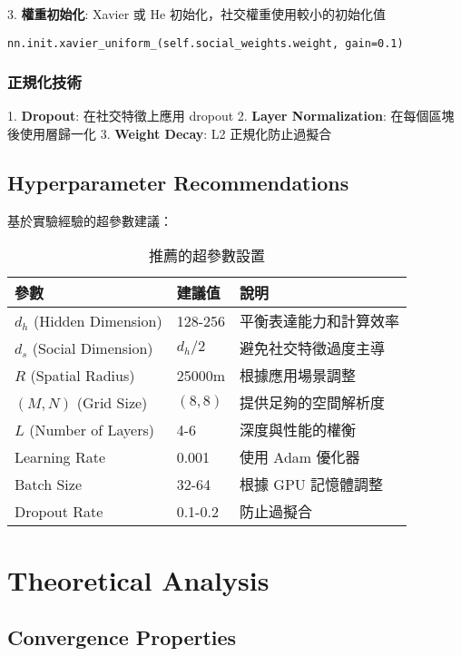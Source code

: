 \documentclass[11pt,a4paper]{article}
\begin{document}
3. \textbf{權重初始化}: Xavier 或 He 初始化，社交權重使用較小的初始化值
   \begin{lstlisting}[style=pythonstyle]
   nn.init.xavier_uniform_(self.social_weights.weight, gain=0.1)
   \end{lstlisting}

\subsubsection{正規化技術}
1. \textbf{Dropout}: 在社交特徵上應用 dropout
2. \textbf{Layer Normalization}: 在每個區塊後使用層歸一化
3. \textbf{Weight Decay}: L2 正規化防止過擬合

\subsection{Hyperparameter Recommendations}

基於實驗經驗的超參數建議：

\begin{table}[h]
\centering
\begin{tabular}{|l|l|l|}
\hline
\textbf{參數} & \textbf{建議值} & \textbf{說明} \\
\hline
$d_h$ (Hidden Dimension) & 128-256 & 平衡表達能力和計算效率 \\
$d_s$ (Social Dimension) & $d_h / 2$ & 避免社交特徵過度主導 \\
$R$ (Spatial Radius) & 25000m & 根據應用場景調整 \\
$(M, N)$ (Grid Size) & $(8, 8)$ & 提供足夠的空間解析度 \\
$L$ (Number of Layers) & 4-6 & 深度與性能的權衡 \\
Learning Rate & 0.001 & 使用 Adam 優化器 \\
Batch Size & 32-64 & 根據 GPU 記憶體調整 \\
Dropout Rate & 0.1-0.2 & 防止過擬合 \\
\hline
\end{tabular}
\caption{推薦的超參數設置}
\end{table}

\section{Theoretical Analysis}

\subsection{Convergence Properties}
\end{document}
